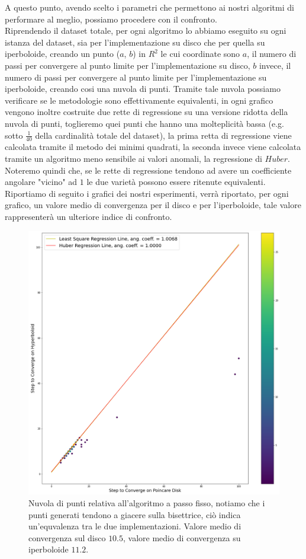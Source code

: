 \documentclass[a4paper, 12pt]{article}
\begin{document}
A questo punto, avendo scelto i parametri che permettono ai nostri algoritmi di performare al meglio, possiamo procedere con il confronto.\\ Riprendendo il dataset totale, per ogni algoritmo lo abbiamo eseguito su ogni istanza del dataset, sia per l'implementazione su disco che per quella su iperboloide, creando un punto  ($a$, $b$) in $R^2$ le cui coordinate sono $a$, il numero di passi per convergere al punto limite per l'implementazione su disco, $b$ invece, il numero di passi per convergere al punto limite per l'implementazione su iperboloide, creando cosi una nuvola di punti. Tramite tale nuvola possiamo verificare se le metodologie sono effettivamente equivalenti, in ogni grafico vengono inoltre costruite due rette di regressione su una versione ridotta della nuvola di punti, toglieremo quei punti che hanno una molteplicità bassa (e.g. sotto $\frac{1}{40}$ della cardinalità totale del dataset), la prima retta di regressione viene calcolata tramite il metodo dei minimi quadrati, la seconda invece viene calcolata tramite un algoritmo meno sensibile ai valori anomali, la regressione di $Huber$. Noteremo quindi che, se le rette di regressione tendono ad avere un coefficiente angolare "vicino" ad $1$ le due varietà possono essere ritenute equivalenti.  Riportiamo di seguito i grafici dei nostri esperimenti, verrà riportato, per ogni grafico, un valore medio di convergenza per il disco e per l'iperboloide, tale valore rappresenterà un ulteriore indice di confronto.\\
\begin{figure}[H] %
    \centering\includegraphics[width=1\textwidth]{fixed_step_size.png}
    \caption{Nuvola di punti relativa all'algoritmo a passo fisso, notiamo che i punti generati tendono a giacere sulla bisettrice, ciò indica un'equvalenza tra le due implementazioni. Valore medio di convergenza sul disco $10.5$, valore medio di convergenza su iperboloide $11.2$.}
\end{figure}
\end{document}
